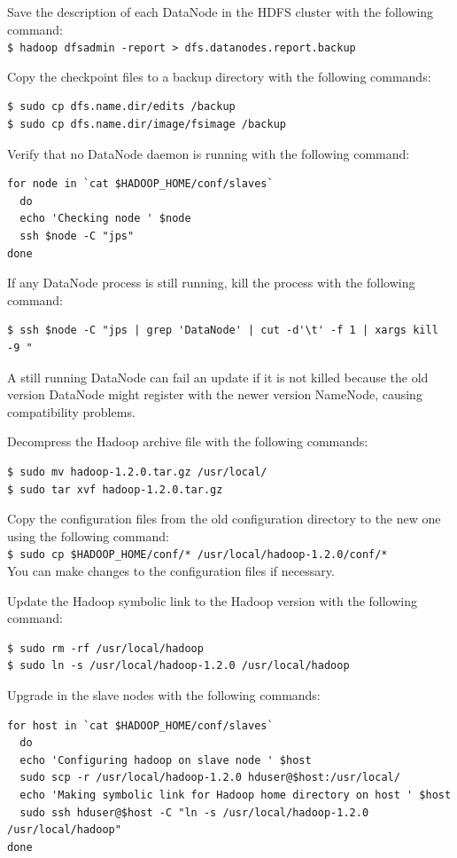 Save the description of each DataNode in the HDFS cluster with the following command: \\ 
\verb|$ hadoop dfsadmin -report > dfs.datanodes.report.backup| 

Copy the checkpoint files to a backup directory with the following commands:
\lstset{style=bashstyle}
\begin{lstlisting}
$ sudo cp dfs.name.dir/edits /backup
$ sudo cp dfs.name.dir/image/fsimage /backup
\end{lstlisting}

Verify that no DataNode daemon is running with the following command:
\begin{verbatim}
for node in `cat $HADOOP_HOME/conf/slaves`
  do
  echo 'Checking node ' $node
  ssh $node -C "jps"
done
\end{verbatim}

If any DataNode process is still running, kill the process with the following command:
\lstset{style=bashstyle}
\begin{lstlisting}
$ ssh $node -C "jps | grep 'DataNode' | cut -d'\t' -f 1 | xargs kill -9 "
\end{lstlisting}

A still running DataNode can fail an update if it is not killed because the old version DataNode might register with the newer version NameNode, causing compatibility problems.

Decompress the Hadoop archive file with the following commands:
\lstset{style=bashstyle}
\begin{lstlisting}
$ sudo mv hadoop-1.2.0.tar.gz /usr/local/
$ sudo tar xvf hadoop-1.2.0.tar.gz
\end{lstlisting}

Copy the configuration files from the old configuration directory to the new one using the following command: \\
\verb|$ sudo cp $HADOOP_HOME/conf/* /usr/local/hadoop-1.2.0/conf/*| \\ 

You can make changes to the configuration files if necessary.

Update the Hadoop symbolic link to the Hadoop version with the following command:
\lstset{style=bashstyle}
\begin{lstlisting}
$ sudo rm -rf /usr/local/hadoop
$ sudo ln -s /usr/local/hadoop-1.2.0 /usr/local/hadoop
\end{lstlisting}

Upgrade in the slave nodes with the following commands:
\lstset{style=bashstyle}
\begin{lstlisting}
for host in `cat $HADOOP_HOME/conf/slaves`
  do
  echo 'Configuring hadoop on slave node ' $host
  sudo scp -r /usr/local/hadoop-1.2.0 hduser@$host:/usr/local/
  echo 'Making symbolic link for Hadoop home directory on host ' $host
  sudo ssh hduser@$host -C "ln -s /usr/local/hadoop-1.2.0 /usr/local/hadoop"
done
\end{lstlisting}

